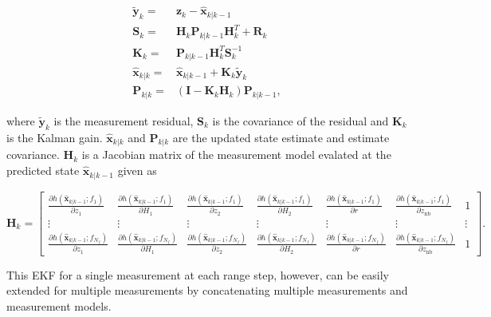\documentclass[technicalnote,oneauthor,latex,dvi2pdf,10pt,a4paper]{Definitions/mdpi}
\begin{document}
\begin{align}
\label{eq:update}
\tilde{\mathbf{y}}_{k} = & \mathbf{z}_k - \hat{\mathbf{x}}_{k|k-1} \\ \nonumber
\boldsymbol{S}_k = & \boldsymbol{H}_k \boldsymbol{P}_{k|k-1} \boldsymbol{H}_k^T
+ \boldsymbol{R}_k \\ \nonumber
\boldsymbol{K}_k = & \boldsymbol{P}_{k|k-1} \boldsymbol{H}_k^T \boldsymbol{S}_k^{-1} \\ \nonumber
\hat{\mathbf{x}}_{k|k} = & \hat{\mathbf{x}}_{k|k-1} + \boldsymbol{K}_k \tilde{\mathbf{y}}_{k} \\ \nonumber
\boldsymbol{P}_{k|k} = & \left(\boldsymbol{I} - \boldsymbol{K}_k \boldsymbol{H}_k \right)\boldsymbol{P}_{k|k-1},
\end{align}

\noindent where $\tilde{\mathbf{y}}_{k}$ is the measurement residual, $\boldsymbol{S}_k$ is the covariance of the residual and $\boldsymbol{K}_k$ is the Kalman gain.
$\hat{\mathbf{x}}_{k|k}$ and $\boldsymbol{P}_{k|k}$ are the updated state estimate and estimate covariance.
$\boldsymbol{H}_k$ is a Jacobian matrix of the measurement model evalated at the predicted state $\hat{\mathbf{x}}_{k|k-1}$ given as

\begin{equation}
\label{eq:jacobian}
\boldsymbol{H}_k = 
\begin{bmatrix}
\frac{\partial h(\hat{\mathbf{x}}_{k|k-1};f_1)}{\partial z_1}
& \frac{\partial h(\hat{\mathbf{x}}_{k|k-1};f_1)}{\partial H_1}
& \frac{\partial h(\hat{\mathbf{x}}_{k|k-1};f_1)}{\partial z_2}
& \frac{\partial h(\hat{\mathbf{x}}_{k|k-1};f_1)}{\partial H_2}
& \frac{\partial h(\hat{\mathbf{x}}_{k|k-1};f_1)}{\partial r}
& \frac{\partial h(\hat{\mathbf{x}}_{k|k-1};f_1)}{\partial z_\text{nb}}
& 1 \\
\vdots & \vdots & \vdots & \vdots & \vdots & \vdots & \vdots \\
\frac{\partial h(\hat{\mathbf{x}}_{k|k-1};f_{N_f})}{\partial z_1}
& \frac{\partial h(\hat{\mathbf{x}}_{k|k-1};f_{N_f})}{\partial H_1}
& \frac{\partial h(\hat{\mathbf{x}}_{k|k-1};f_{N_f})}{\partial z_2}
& \frac{\partial h(\hat{\mathbf{x}}_{k|k-1};f_{N_f})}{\partial H_2}
& \frac{\partial h(\hat{\mathbf{x}}_{k|k-1};f_{N_f})}{\partial r}
& \frac{\partial h(\hat{\mathbf{x}}_{k|k-1};f_{N_f})}{\partial z_\text{nb}}
& 1
\end{bmatrix}.
\end{equation}

\noindent This EKF for a single measurement at each range step, however, can be easily extended for multiple measurements by concatenating multiple measurements and measurement models.
\end{document}
